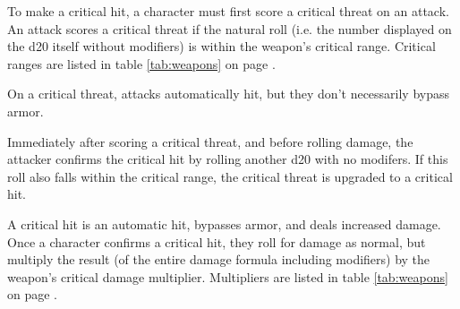 \begin{multicols*}{2}
    To make a critical hit, a character must first score a critical
    threat on an attack. An attack scores a critical
    threat if the natural roll (i.e. the number displayed on the d20 itself
    without modifiers) is within the weapon's critical range. Critical ranges
    are listed in table \ref{tab:weapons} on page \pageref{tab:weapons}.

    On a critical threat, attacks automatically hit, but they don't necessarily
    bypass armor.

    Immediately after scoring a critical threat, and before rolling damage, the
    attacker confirms the critical hit by rolling another d20 with no modifers.
    If this roll also falls within the critical range, the critical threat is
    upgraded to a critical hit.

    A critical hit is an automatic hit, bypasses armor, and deals increased
    damage. Once a character confirms a critical hit, they roll for damage
    as normal, but multiply the result (of the entire damage formula including
    modifiers) by the weapon's critical damage multiplier. Multipliers are
    listed in table \ref{tab:weapons} on page \pageref{tab:weapons}.
\end{multicols*}
